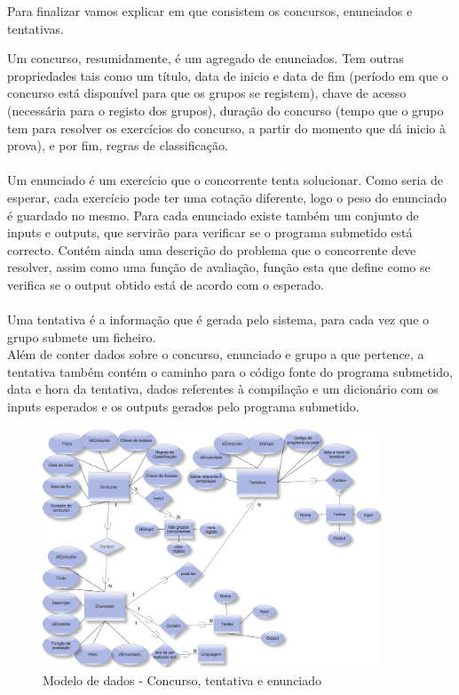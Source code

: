 Para finalizar vamos explicar em que consistem os concursos, enunciados e tentativas.

Um concurso, resumidamente, é um agregado de enunciados. 
Tem outras propriedades tais como um título, data de inicio e data de fim (período em que o concurso está disponível para que os grupos se registem), 
chave de acesso (necessária para o registo dos grupos), duração do concurso (tempo que o grupo tem para resolver os exercícios do concurso, 
a partir do momento que dá inicio à prova), e por fim, regras de classificação.\\
\\
Um enunciado é um exercício que o concorrente tenta solucionar. Como seria de esperar, cada exercício pode ter uma cotação diferente, 
logo o peso do enunciado é guardado no mesmo. 
Para cada enunciado existe também um conjunto de inputs e outputs, que servirão para verificar se o programa submetido está correcto. 
Contém ainda uma descrição do problema que o concorrente deve resolver, assim como uma função de avaliação, função esta que define como
 se verifica se o output obtido está de acordo com o esperado.\\
\\
Uma tentativa é a informação que é gerada pelo sistema, para cada vez que o grupo submete um ficheiro.\\
Além de conter dados sobre o concurso, enunciado e grupo a que pertence, a tentativa também contém o caminho para o código fonte do programa
submetido, data e hora da tentativa, dados referentes à compilação e um dicionário com os inputs esperados e os outputs gerados pelo programa
submetido.
\begin{figure}[htbp]
\begin{center}
\includegraphics[width=0.9\textwidth]{Images/concurso-enunciado}
\caption{Modelo de dados - Concurso, tentativa e enunciado}\label{fig modedados-conc-enunc}
\end{center}
\end{figure}

